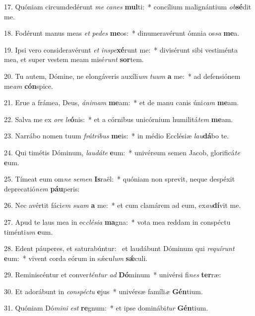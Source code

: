 17. Quóniam circumdedérunt \textit{me} \textit{ca}\textit{nes} \textbf{mul}ti:~*  concílium malignántium \textit{ob}\textbf{sé}dit me.\

18. Fodérunt manus meas \textit{et} \textit{pe}\textit{des} \textbf{me}os:~*  dinumeravérunt ómnia os\textit{sa} \textbf{me}a.\

19. Ipsi vero consideravérunt \textit{et} \textit{in}\textit{spe}\textbf{xé}runt me:~*  divisérunt sibi vestiménta mea, et super vestem meam misé\textit{runt} \textbf{sor}tem.\

20. Tu autem, Dómine, ne elongáveris auxíli\textit{um} \textit{tu}\textit{um} \textbf{a} me:~*  ad defensiónem me\textit{am} \textbf{cón}spice.\

21. Erue a frámea, Deus, \textit{á}\textit{ni}\textit{mam} \textbf{me}am:~*  et de manu canis úni\textit{cam} \textbf{me}am.\

22. Salva me ex \textit{o}\textit{re} \textit{le}\textbf{ó}nis:~*  et a córnibus unicórnium humilitá\textit{tem} \textbf{me}am.\

23. Narrábo nomen tuum \textit{frá}\textit{tri}\textit{bus} \textbf{me}is:~*  in médio Ecclésiæ \textit{lau}\textbf{dá}bo te.\

24. Qui timétis Dóminum, \textit{lau}\textit{dá}\textit{te} \textbf{e}um:~*  univérsum semen Jacob, glorificá\textit{te} \textbf{e}um.\

25. Tímeat eum om\textit{ne} \textit{se}\textit{men} \textbf{Is}raël:~*  quóniam non sprevit, neque despéxit deprecatió\textit{nem} \textbf{páu}peris:\

26. Nec avértit fáci\textit{em} \textit{su}\textit{am} \textbf{a} me:~*  et cum clamárem ad eum, ex\textit{au}\textbf{dí}vit me.\

27. Apud te laus mea in ec\textit{clé}\textit{si}\textit{a} \textbf{ma}gna:~*  vota mea reddam in conspéctu timénti\textit{um} \textbf{e}um.\

28. Edent páuperes, et saturabúntur: \dag\  et laudábunt Dóminum qui \textit{re}\textit{quí}\textit{runt} \textbf{e}um:~*  vivent corda eórum in sǽcu\textit{lum} \textbf{sǽ}culi.\

29. Reminiscéntur et conver\textit{tén}\textit{tur} \textit{ad} \textbf{Dó}minum~*  univérsi fi\textit{nes} \textbf{ter}ræ:\

30. Et adorábunt in \textit{con}\textit{spéc}\textit{tu} \textbf{e}jus~*  univérsæ famíli\textit{æ} \textbf{Gén}tium.\

31. Quóniam Dó\textit{mi}\textit{ni} \textit{est} \textbf{re}gnum:~*  et ipse dominábi\textit{tur} \textbf{Gén}tium.\

